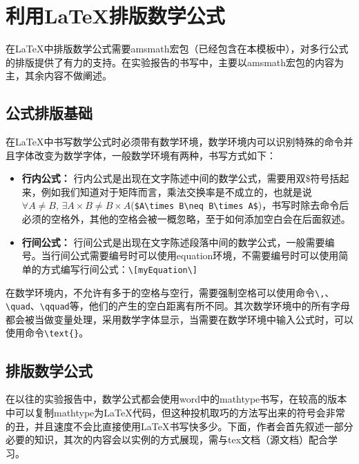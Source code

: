 \section{利用\LaTeX 排版数学公式}
在\LaTeX 中排版数学公式需要amsmath宏包（已经包含在本模板中），对多行公式的排版提供了有力的支持。在实验报告的书写中，主要以amsmath宏包的内容为主，其余内容不做阐述。
\subsection{公式排版基础}
在\LaTeX 中书写数学公式时必须带有数学环境，数学环境内可以识别特殊的命令并且字体改变为数学字体，一般数学环境有两种，书写方式如下：
\begin{itemize}
\item \textbf{行内公式：} 行内公式是出现在文字陈述中间的数学公式，需要用双\$符号括起来，例如我们知道对于矩阵而言，乘法交换率是不成立的，也就是说$\forall A\neq B,\, \exists A\times B\neq B\times A$(\verb|$A\times B\neq B\times A$|)，书写时除去命令后必须的空格外，其他的空格会被一概忽略，至于如何添加空白会在后面叙述。
\item \textbf{行间公式：} 行间公式是出现在文字陈述段落中间的数学公式，一般需要编号。当行间公式需要编号时可以使用equation环境，不需要编号时可以使用简单的方式编写行间公式：\verb|\[myEquation\]|
\end{itemize}

在数学环境内，不允许有多于的空格与空行，需要强制空格可以使用命令\verb|\,|、\verb|\quad|、\verb|\qquad|等，他们的产生的空白距离有所不同。其次数学环境中的所有字母都会被当做变量处理，采用数学字体显示，当需要在数学环境中输入公式时，可以使用命令\verb|\text{}|。
\subsection{排版数学公式}
在以往的实验报告中，数学公式都会使用word中的mathtype书写，在较高的版本中可以复制mathtype为\LaTeX 代码，但这种投机取巧的方法写出来的符号会非常的丑，并且速度不会比直接使用\LaTeX 书写快多少。下面，作者会首先叙述一部分必要的知识，其次的内容会以实例的方式展现，需与tex文档（源文档）配合学习。

